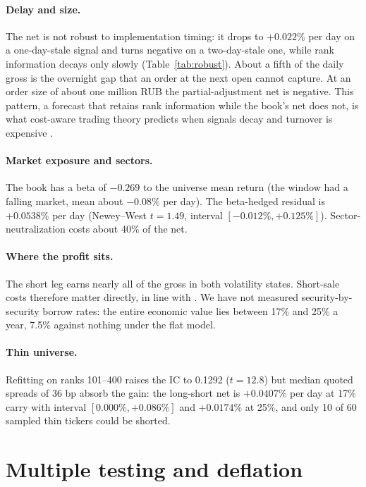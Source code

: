 \documentclass[11pt]{article}
\begin{document}
\paragraph{Delay and size.} The net is not robust to implementation timing: it drops to $+0.022\%$ per day on a one-day-stale signal and turns negative on a two-day-stale one, while rank information decays only slowly (Table~\ref{tab:robust}). About a fifth of the daily gross is the overnight gap that an order at the next open cannot capture. At an order size of about one million RUB the partial-adjustment net is negative. This pattern, a forecast that retains rank information while the book's net does not, is what cost-aware trading theory predicts when signals decay and turnover is expensive \citep{garleanu2013dynamic,ledoit2025markowitz}.

\paragraph{Market exposure and sectors.} The book has a beta of $-0.269$ to the universe mean return (the window had a falling market, mean about $-0.08\%$ per day). The beta-hedged residual is $+0.0538\%$ per day (Newey--West $t=1.49$, interval $[-0.012\%,+0.125\%]$). Sector-neutralization costs about 40\% of the net.

\paragraph{Where the profit sits.} The short leg earns nearly all of the gross in both volatility states. Short-sale costs therefore matter directly, in line with \citet{muravyev2025anomalies}. We have not measured security-by-security borrow rates: the entire economic value lies between 17\% and 25\% a year, 7.5\% against nothing under the flat model.

\paragraph{Thin universe.} Refitting on ranks 101--400 raises the IC to 0.1292 ($t=12.8$) but median quoted spreads of 36 bp absorb the gain: the long-short net is $+0.0407\%$ per day at 17\% carry with interval $[0.000\%,+0.086\%]$ and $+0.0174\%$ at 25\%, and only 10 of 60 sampled thin tickers could be shorted.

\section{Multiple testing and deflation}\label{sec:multiple}
\end{document}
